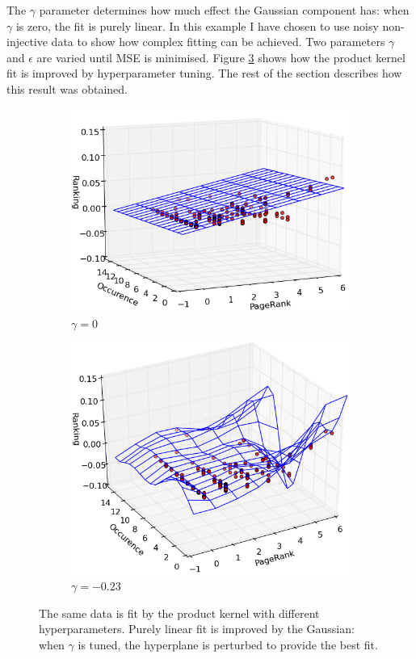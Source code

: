 \documentclass[12pt,a4paper,notitlepage,twoside]{scrbook}
\begin{document}
The \(\gamma\) parameter determines how much effect the Gaussian component has: when
\(\gamma\) is zero, the fit is purely linear.
In this example I have chosen to use noisy non-injective data to show how complex fitting
can be achieved. Two parameters $\gamma$ and $\epsilon$ are varied
until MSE is minimised. Figure \ref{fits} shows how the product kernel fit is improved by
hyperparameter tuning.
The rest of the section describes how this result was obtained.
\begin{figure}[hb]
\centering
\begin{subfigure}[b]{.49\textwidth}
  \centering
  \includegraphics[width=\linewidth]{figs/lin_fit.png}
  \caption{\(\gamma=0\)\label{linear_kernel_fit}}
\end{subfigure}
\begin{subfigure}[b]{.49\textwidth}
  \centering
  \includegraphics[width=\linewidth]{figs/perf_fit.png}
  \caption{\(\gamma=-0.23\) \label{product_kernel_fit}}
\end{subfigure}
\caption{The same data is fit by the product kernel with different hyperparameters. Purely
	linear fit is improved by the Gaussian: when $\gamma$ is tuned, the hyperplane is
	perturbed to provide the best fit.\label{fits}}
\end{figure}
\end{document}
